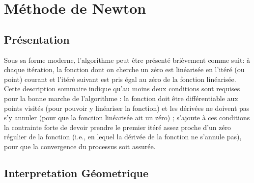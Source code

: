 \documentclass{article}
\begin{document}
\newpage




\section{Méthode de Newton}
\subsection{Présentation} 
    Sous sa forme moderne, l'algorithme peut être présenté brièvement comme suit: à chaque itération, la fonction dont on cherche un zéro est linéarisée en l'itéré (ou point) courant et l'itéré suivant est pris égal au zéro de la fonction linéarisée. Cette description sommaire indique qu'au moins deux conditions sont requises pour la bonne marche de l'algorithme : la fonction doit être différentiable aux points visités (pour pouvoir y linéariser la fonction) et les dérivées ne doivent pas s'y annuler (pour que la fonction linéarisée ait un zéro) ; s'ajoute à ces conditions la contrainte forte de devoir prendre le premier itéré assez proche d'un zéro régulier de la fonction (i.e., en lequel la dérivée de la fonction ne s'annule pas), pour que la convergence du processus soit assurée.

\subsection{Interpretation Géometrique}
\end{document}
